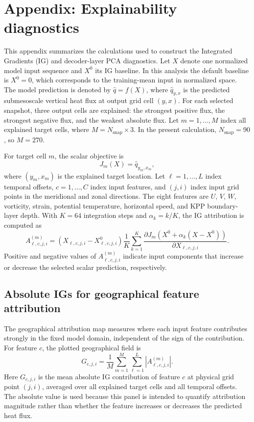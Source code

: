 \section{Appendix: Explainability diagnostics}
\label{app:explainability-diagnostics}

This appendix summarizes the calculations used to construct the Integrated Gradients (IG) and decoder-layer PCA diagnostics. Let \(X\) denote one normalized model input sequence and \(X^{0}\) its IG baseline. In this analysis the default baseline is \(X^{0}=0\), which corresponds to the training-mean input in normalized space. The model prediction is denoted by \(\hat{q}=f(X)\), where \(\hat{q}_{y,x}\) is the predicted submesoscale vertical heat flux at output grid cell \((y,x)\). For each selected snapshot, three output cells are explained: the strongest positive flux, the strongest negative flux, and the weakest absolute flux. Let \(m=1,\ldots,M\) index all explained target cells, where \(M=N_{\mathrm{snap}}\times 3\). In the present calculation, \(N_{\mathrm{snap}}=90\), so \(M=270\).

For target cell \(m\), the scalar objective is
\[
J_m(X)=\hat{q}_{y_m,x_m},
\]
where \((y_m,x_m)\) is the explained target location. Let \(\ell=1,\ldots,L\) index temporal offsets, \(c=1,\ldots,C\) index input features, and \((j,i)\) index input grid points in the meridional and zonal directions. The eight features are \(U\), \(V\), \(W\), vorticity, strain, potential temperature, horizontal speed, and KPP boundary-layer depth. With \(K=64\) integration steps and \(\alpha_k=k/K\), the IG attribution is computed as
\[
A^{(m)}_{\ell,c,j,i}
=
\left(X_{\ell,c,j,i}-X^{0}_{\ell,c,j,i}\right)
\frac{1}{K}\sum_{k=1}^{K}
\frac{\partial J_m\!\left(X^{0}+\alpha_k(X-X^{0})\right)}
{\partial X_{\ell,c,j,i}} .
\]
Positive and negative values of \(A^{(m)}_{\ell,c,j,i}\) indicate input components that increase or decrease the selected scalar prediction, respectively.

\subsection{Absolute IGs for geographical feature attribution}
\label{app:absolute-igs-geographical}

The geographical attribution map measures where each input feature contributes strongly in the fixed model domain, independent of the sign of the contribution. For feature \(c\), the plotted geographical field is
\[
G_{c,j,i}
=
\frac{1}{M}\sum_{m=1}^{M}\sum_{\ell=1}^{L}
\left|A^{(m)}_{\ell,c,j,i}\right| .
\]
Here \(G_{c,j,i}\) is the mean absolute IG contribution of feature \(c\) at physical grid point \((j,i)\), averaged over all explained target cells and all temporal offsets. The absolute value is used because this panel is intended to quantify attribution magnitude rather than whether the feature increases or decreases the predicted heat flux.


